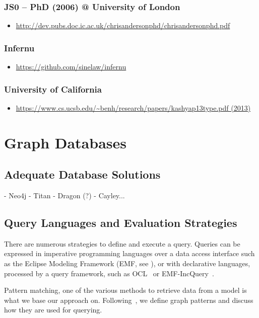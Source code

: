  \subsubsection{JS0 -- PhD (2006) @ University of London}
 \begin{itemize}
   \item \url{http://dev.pubs.doc.ic.ac.uk/chrisandersonphd/chrisandersonphd.pdf}
 \end{itemize}

 \subsubsection{Infernu}
 \begin{itemize}
   \item \url{https://github.com/sinelaw/infernu}
 \end{itemize}

 \subsubsection{University of California}
 \begin{itemize}
   \item \url{https://www.cs.ucsb.edu/~benh/research/papers/kashyap13type.pdf (2013)}
 \end{itemize}


 \section{Graph Databases}
 \subsection{Adequate Database Solutions}
  - Neo4j
  - Titan
  - Dragon (?)
  - Cayley...

 \subsection{Query Languages and Evaluation Strategies}
 There are numerous strategies to define and execute a query. Queries can be expressed in imperative programming languages over a data access interface such as the Eclipse Modeling Framework (EMF, see ), or with declarative languages, processed by a query framework, such as OCL~\cite{OCL} or EMF-IncQuery~\cite{IncQuery}.

 Pattern matching, one of the various methods to retrieve data from a model is what we base our approach on. Following~\cite{csmr}, we define graph patterns and discuss how they are used for querying.

